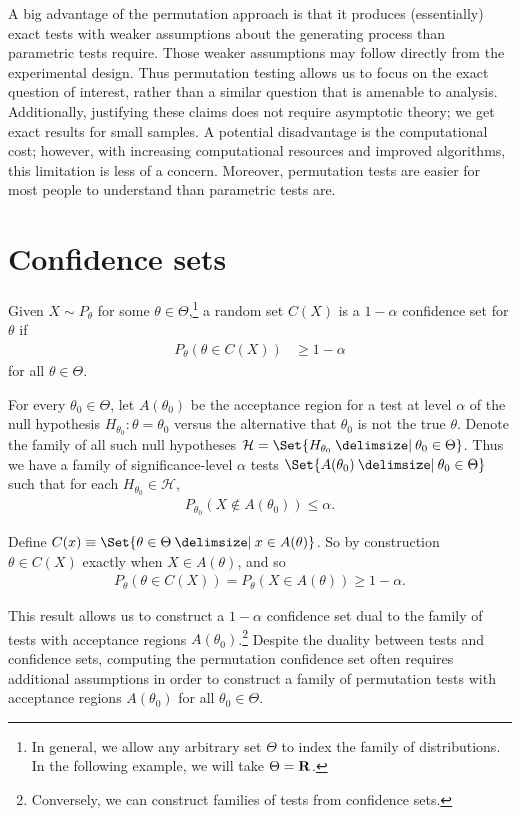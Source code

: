 A big advantage of the permutation approach is that it produces (essentially) exact 
tests with weaker assumptions 
about the generating process than parametric tests require.
Those weaker assumptions may follow directly from the 
experimental design.  Thus
permutation testing allows us to focus on the exact question of interest,
rather than a similar question that is amenable to analysis.  Additionally,
justifying these claims does not require asymptotic theory; 
we get exact results for small samples.  A potential disadvantage is the
computational cost; however, with increasing computational resources and
improved algorithms, this limitation is less of a concern.
Moreover, permutation tests are easier for most people to understand than
parametric tests are.

\section{Confidence sets}

Given $X \sim P_\theta$ for some $\theta \in \Theta$,\footnote{In general, we allow any
arbitrary set $\Theta$ to index the family of distributions. In the following example, we will take $\Theta =\mathbf{R}$.} a random set
$C(X)$ is a $1 - \alpha$ confidence set for $\theta$ if
\begin{align*}
P_\theta(\theta \in C(X)) &\ge 1 - \alpha
\end{align*}
for all $\theta \in \Theta$.

For every $\theta_0 \in \Theta$, let $A(\theta_0)$ be the acceptance region for
a test at level $\alpha$ of the null hypothesis $H_{\theta_0}: \theta =
\theta_0$ versus the alternative that $\theta_0$ is not the true $\theta$.
Denote the family of all such null hypotheses $\mathcal{H} = \Set{H_{\theta_0}
\given \theta_0 \in \Theta}$.  Thus we have a family of significance-level
$\alpha$ tests $\Set{A(\theta_0) \given \theta_0 \in \Theta}$ such that for
each $H_{\theta_0} \in \mathcal{H}$,
\begin{align*}
P_{\theta_0}(X \notin A(\theta_0)) \le \alpha.
\end{align*}

Define $C(x) \equiv \Set{\theta \in \Theta \given x \in A(\theta)}$.
So by construction $\theta \in C(X)$ exactly when $X \in A(\theta)$, and so
\begin{align*}
P_{\theta}(\theta \in C(X)) = P_{\theta}(X \in A(\theta)) \ge 1 - \alpha.
\end{align*}

This result allows us to construct a $1-\alpha$ confidence set dual to
the family of tests with acceptance regions $A(\theta_0)$.\footnote{Conversely,
we can construct families of tests from confidence sets.}  Despite the duality
between tests and confidence sets, computing the permutation confidence set
often requires additional assumptions in order to construct a family of
permutation tests with acceptance regions $A(\theta_0)$ for all $\theta_0 \in
\Theta$.

